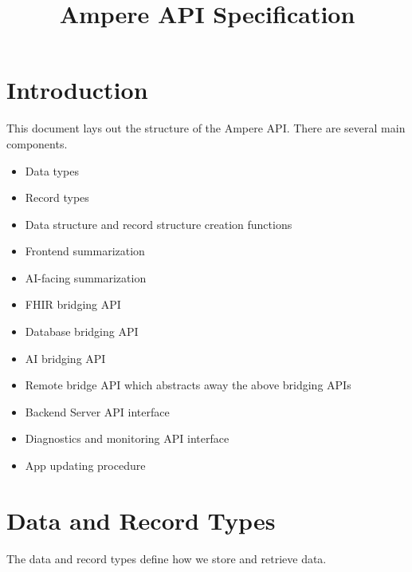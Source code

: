 \documentclass[12pt]{article}
\title{Ampere API Specification}
\begin{document}
\maketitle

\tableofcontents


\section{Introduction}
This document lays out the structure of the Ampere API. There are several main components.

\begin{itemize}
\item Data types
\item Record types
\item Data structure and record structure creation functions
\item Frontend summarization
\item AI-facing summarization
\item FHIR bridging API
\item Database bridging API
\item AI bridging API
\item Remote bridge API which abstracts away the above bridging APIs
\item Backend Server API interface
\item Diagnostics and monitoring API interface
\item App updating procedure
\end{itemize}

\section{Data and Record Types}
The data and record types define how we store and retrieve data.
\end{document}
